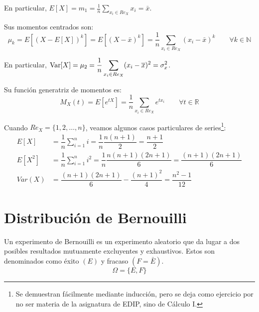 En particular, $\displaystyle E[X]=m_1 = \frac{1}{n} \sum_{x_i\in Re_X}x_i = \bar{x}$.

Sus momentos centrados son:
\begin{equation*}
    \mu_k = E[(X-E[X])^k]
    = E[(X-\bar{x})^k]
    = \frac{1}{n} \sum_{x_i\in Re_X}(x_i-\bar{x})^k   
    \qquad \forall k\in \mathbb{N}
\end{equation*}

En particular, $\displaystyle \operatorname{Var}[X]=\mu_2 = \frac{1}{n} \sum_{x_i\in Re_X}(x_i-\overline{x})^2 = \sigma_{x}^2$.

Su función generatriz de momentos es:
\begin{equation*}
    M_X(t) = E[e^{tX}] = \frac{1}{n} \sum_{x_i\in Re_X}e^{tx_i}     
    \qquad \forall t\in \mathbb{R}
\end{equation*}

Cuando $Re_X = \{1, 2, \ldots, n\}$, veamos algunos casos particulares de series\footnote{Se demuestran fácilmente mediante inducción, pero se deja como ejercicio por no ser materia de la asignatura de EDIP, sino de Cálculo I.}:
\begin{equation*}
    \begin{split}
        E[X] &= \dfrac{1}{n}\sum_{i=1}^n i = \dfrac{1}{n}\dfrac{n(n+1)}{2} = \dfrac{n+1}{2}\\
        E[X^2] &= \dfrac{1}{n}\sum_{i=1}^n i^2 = \dfrac{1}{n}\dfrac{n(n+1)(2n+1)}{6} = \dfrac{(n+1)(2n+1)}{6}\\
        Var(X) &= \dfrac{(n+1)(2n+1)}{6} - \dfrac{(n+1)^2}{4} = \dfrac{n^2-1}{12}
    \end{split}
\end{equation*}



\section{Distribución de Bernouilli}

\begin{definicion}
    Un experimento de Bernouilli es un experimento aleatorio que da lugar a dos posibles resultados mutuamente excluyentes y exhaustivos. Estos son denominados como éxito $(E)$ y fracaso $(F=\bar{E})$.
    \begin{equation*}
        \Omega = \{E,F\}
    \end{equation*}
\end{definicion}

